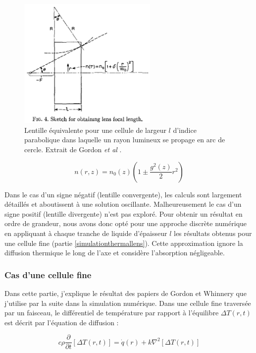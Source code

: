 \begin{figure}
\centering
\includegraphics[width=0.6\textwidth]{./files/gordon_lens.png}
\caption{Lentille équivalente pour une cellule de largeur $l$ d'indice parabolique dans laquelle un rayon lumineux se propage en arc de cercle. Extrait de Gordon \emph{et al} \cite{gordon_longtransient_1965}.
\label{FIGgordonlens}}
\end{figure}

$$
n(r,z) = n_0(z) \left( 1 \pm \frac{g^2(z)}{2}r^2\right)
$$

Dans le cas d'un signe négatif (lentille convergente), les calculs sont largement détaillés et aboutissent à une solution oscillante. Malheureusement le cas d'un signe positif (lentille divergente) n'est pas exploré. Pour obtenir un résultat en ordre de grandeur, nous avons donc opté pour une approche discrète numérique en appliquant à chaque tranche de liquide d'épaisseur $l$ les résultats obtenus pour une cellule fine (partie \ref{simulationthermallens}). Cette approximation ignore la diffusion thermique le long de l'axe et considère l'absorption négligeable.

\subsubsection{Cas d'une cellule fine}\label{cellulefine}

Dans cette partie, j'explique le résultat des papiers de Gordon et Whinnery que j'utilise par la suite dans la simulation numérique. Dans une cellule fine traversée par un faisceau, le différentiel de température par rapport à l'équilibre $\Delta T(r,t)$ est décrit par l'équation de diffusion :

$$
c\rho\frac{\partial}{\partial t}[\Delta T(r,t)] = \dot{q}(r) + k \nabla^2[\Delta T(r,t)]
$$

